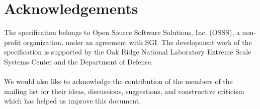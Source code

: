 \date{\today}

\section*{Acknowledgements}
The \openshmem specification belongs to Open Source Software Solutions, Inc. (OSSS), a non-profit organization, under an agreement with SGI. The development work of the specification is supported by the Oak Ridge National Laboratory Extreme Scale Systems Center and the Department of Defense.\\
\\
We would also like to acknowledge the contribution of the members of the \openshmem mailing list for their ideas, discussions, suggestions, and constructive criticism which has helped us improve this document.


%
%

{\large \pagebreak{}}
